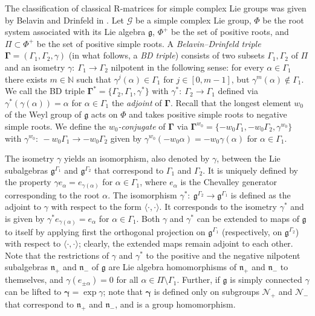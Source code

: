 \documentclass{amsart}
\theoremstyle{definition}
\theoremstyle{remark}
\numberwithin{equation}{section}
\numberwithin{theorem}{section}
\def\G{{\mathcal G}}
\def\N{\mathcal N}
\def\bfG{\mathbf \Gamma}
\def\bgamma{\pmb\gamma}
\def\g{\mathfrak g}
\def\n{\mathfrak n}
\def\Kil{\langle {\cdot},{\cdot}\rangle}
\def\:{{:\ }}
\begin{document}
The classification of classical R-matrices for simple complex Lie groups was given by Belavin and Drinfeld in \cite{BD}.
Let $\G$ be a simple complex Lie group, $\Phi$ be the root system associated with its Lie algebra $\g$, $\Phi^+$ be the set of positive roots, and $\Pi\subset \Phi^+$ be the set of positive simple roots. 
A {\em Belavin--Drinfeld triple} $\bfG=(\Gamma_1,\Gamma_2, \gamma)$ (in what follows, a {\em BD triple\/})
consists of two subsets $\Gamma_1,\Gamma_2$ of $\Pi$ and an isometry $\gamma\:\Gamma_1\to\Gamma_2$ nilpotent in the 
following sense: for every $\alpha \in \Gamma_1$ there exists $m\in\mathbb{N}$ such that $\gamma^j(\alpha)\in \Gamma_1$ 
for $j\in [0,m-1]$, but $\gamma^m(\alpha)\notin \Gamma_1$.  We call the BD triple 
$\bfG^*=\{\Gamma_2,\Gamma_1, \gamma^*\}$ with $\gamma^*\: \Gamma_2\to \Gamma_1$ defined via 
$\gamma^*(\gamma(\alpha)) = \alpha$ for $\alpha\in \Gamma_1$ the {\em adjoint\/} of $\bfG$. 
Recall that the longest element $w_0$ of the Weyl group of $\g$ acts on $\Phi$ and takes positive simple roots to negative simple roots. We define the {\em $w_0$-conjugate\/} of $\bfG$ %
via $\bfG^{w_0}=\{-w_0\Gamma_1,-w_0\Gamma_2, \gamma^{w_0}\}$ with $\gamma^{w_0}\: -w_0\Gamma_1\to-w_0\Gamma_2$
given by $\gamma^{w_0}(-w_0\alpha) = -w_0\gamma(\alpha)$ for $\alpha\in \Gamma_1$.


 The isometry $\gamma$ yields an isomorphism, also denoted by $\gamma$, between the Lie subalgebras $\g^{\Gamma_1}$ 
and $\g^{\Gamma_2}$ that correspond to $\Gamma_1$ and $\Gamma_2$. It is uniquely defined by the property 
$\gamma e_\alpha = e_{\gamma(\alpha)}$ for $\alpha\in \Gamma_1$, where $e_\alpha$ is the Chevalley generator corresponding to 
the root $\alpha$. The isomorphism $\gamma^*\: \g^{\Gamma_2} \to \g^{\Gamma_1}$ is defined as the adjoint to $\gamma$ with respect to the form $\Kil$.  It corresponds to the isometry $\gamma^*$ and 
is given by $\gamma^* e_{\gamma(\alpha)}=e_{\alpha}$ for $\alpha\in \Gamma_1$.
 Both $\gamma$ and $\gamma^*$ can be extended to maps of $\g$ to itself by applying first the orthogonal
projection on $\g^{\Gamma_1}$ (respectively, on $\g^{\Gamma_2}$) with respect to $\Kil$; clearly, the extended
maps remain adjoint to each other. Note that the restrictions of $\gamma$ and $\gamma^*$ to the positive and the negative nilpotent subalgebras $\n_+$ and $\n_-$ of $\g$ are Lie algebra homomorphisms 
of $\n_+$ and $\n_-$  to themselves, and $\gamma(e_{\pm\alpha})=0$
for all $\alpha\in\Pi\setminus\Gamma_1$. Further, if $\g$ is simply connected $\gamma$ can be lifted to $\bgamma=\exp\gamma$;  note that $\bgamma$ is  defined only on subgroups $\N_+$ and $\N_-$ that correspond to $\n_+$ and $\n_-$,
and is a group homomorphism. 
\end{document}
